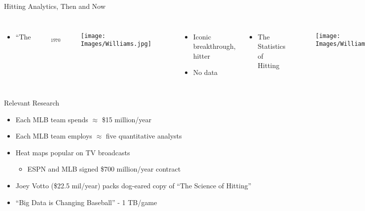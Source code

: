 \documentclass{beamer}
\begin{document}
\begin{frame}{Hitting Analytics, Then and Now} %
\begin{columns}
\begin{itemize}
\item $\text{``The Science of Hitting''}_{\text{1970}}$
\end{itemize}

        \begin{figure}[H]
      	\centering
      	\texttt{[image: Images/Williams.jpg]}
      	\end{figure}
      
\begin{itemize}
\item Iconic breakthrough, hitter
\item No data
\end{itemize}

\begin{itemize}
\item The Statistics of Hitting
\end{itemize}
  \begin{figure}[H]
	\centering
	\texttt{[image: Images/WilliamsMother.jpg]}
	\end{figure}
\begin{itemize}
\item PITCHf/x data!
\item Relevant? 
\end{itemize}

\end{columns}
\end{frame}



\begin{frame}{Relevant Research}{} %
\begin{itemize}
\addtolength{\itemsep}{0.5\baselineskip}
  \item Each MLB\textsuperscript{\textregistered} team spends $\approx$ \$15 million/year
  \item Each MLB\textsuperscript{\textregistered} team employs $\approx$ five quantitative analysts
  \item Heat maps popular on TV broadcasts
        \begin{itemize}
        \addtolength{\itemsep}{0.5\baselineskip}
        \item ESPN\textsuperscript{\textregistered} and MLB\textsuperscript{\textregistered} signed \$700 million/year contract
        \end{itemize}
  \item Joey Votto (\$22.5 mil/year) packs dog-eared copy of ``The Science of Hitting'' 
\item ``Big Data is Changing Baseball'' -  1 TB/game \citep{Delgado2014} 

\end{itemize}
\end{frame}
  
\end{document}
